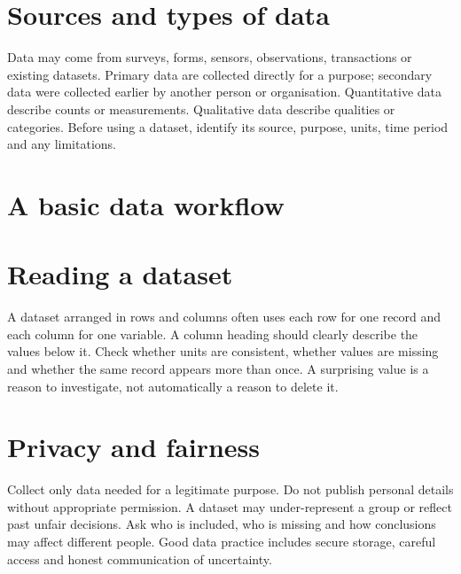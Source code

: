 \documentclass[11pt,openany,oneside]{book}
\begin{document}
\section{Sources and types of data}
Data may come from surveys, forms, sensors, observations, transactions or existing datasets. Primary data are collected directly for a purpose; secondary data were collected earlier by another person or organisation. Quantitative data describe counts or measurements. Qualitative data describe qualities or categories. Before using a dataset, identify its source, purpose, units, time period and any limitations.

\section{A basic data workflow}
\begin{center}
\end{center}

\section{Reading a dataset}
A dataset arranged in rows and columns often uses each row for one record and each column for one variable. A column heading should clearly describe the values below it. Check whether units are consistent, whether values are missing and whether the same record appears more than once. A surprising value is a reason to investigate, not automatically a reason to delete it.

\section{Privacy and fairness}
Collect only data needed for a legitimate purpose. Do not publish personal details without appropriate permission. A dataset may under-represent a group or reflect past unfair decisions. Ask who is included, who is missing and how conclusions may affect different people. Good data practice includes secure storage, careful access and honest communication of uncertainty.
\end{document}
